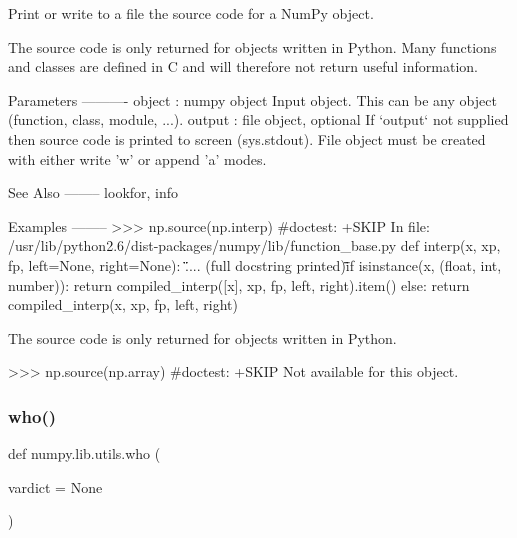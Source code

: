 \begin{DoxyVerb}Print or write to a file the source code for a NumPy object.

The source code is only returned for objects written in Python. Many
functions and classes are defined in C and will therefore not return
useful information.

Parameters
----------
object : numpy object
    Input object. This can be any object (function, class, module,
    ...).
output : file object, optional
    If `output` not supplied then source code is printed to screen
    (sys.stdout).  File object must be created with either write 'w' or
    append 'a' modes.

See Also
--------
lookfor, info

Examples
--------
>>> np.source(np.interp)                        #doctest: +SKIP
In file: /usr/lib/python2.6/dist-packages/numpy/lib/function_base.py
def interp(x, xp, fp, left=None, right=None):
    \"\"\".... (full docstring printed)\"\"\"
    if isinstance(x, (float, int, number)):
        return compiled_interp([x], xp, fp, left, right).item()
    else:
        return compiled_interp(x, xp, fp, left, right)

The source code is only returned for objects written in Python.

>>> np.source(np.array)                         #doctest: +SKIP
Not available for this object.\end{DoxyVerb}
 \mbox{\label{namespacenumpy_1_1lib_1_1utils_a26df04e9904b2e3349eaff91896cc156}} 
\subsubsection{\texorpdfstring{who()}{who()}}
{\footnotesize\ttfamily def numpy.\+lib.\+utils.\+who (\begin{DoxyParamCaption}\item[{}]{vardict = {\ttfamily None} }\end{DoxyParamCaption})}

